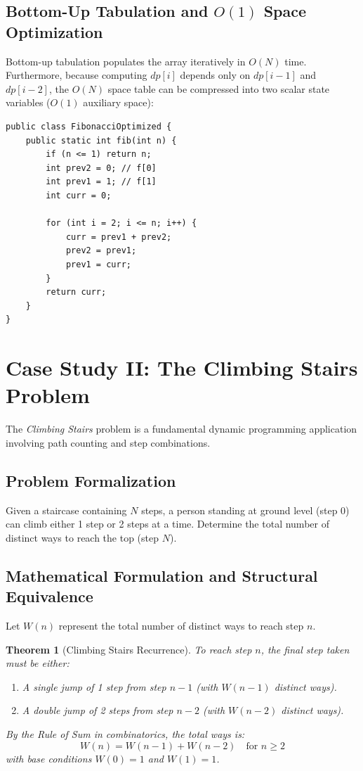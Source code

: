 \documentclass[10pt,journal,compsoc,onecolumn]{IEEEtran}
\newtheorem{theorem}{Theorem}
\begin{document}
\subsection{Bottom-Up Tabulation and $O(1)$ Space Optimization}

Bottom-up tabulation populates the array iteratively in $O(N)$ time. Furthermore, because computing $dp[i]$ depends only on $dp[i-1]$ and $dp[i-2]$, the $O(N)$ space table can be compressed into two scalar state variables ($O(1)$ auxiliary space):

\begin{verbatim}
public class FibonacciOptimized {
    public static int fib(int n) {
        if (n <= 1) return n;
        int prev2 = 0; // f[0]
        int prev1 = 1; // f[1]
        int curr = 0;

        for (int i = 2; i <= n; i++) {
            curr = prev1 + prev2;
            prev2 = prev1;
            prev1 = curr;
        }
        return curr;
    }
}
\end{verbatim}


\section{Case Study II: The Climbing Stairs Problem}
\label{sec:climbing-stairs}

The \emph{Climbing Stairs} problem is a fundamental dynamic programming application involving path counting and step combinations.

\subsection{Problem Formalization}

Given a staircase containing $N$ steps, a person standing at ground level (step 0) can climb either 1 step or 2 steps at a time. Determine the total number of distinct ways to reach the top (step $N$).

\subsection{Mathematical Formulation and Structural Equivalence}

Let $W(n)$ represent the total number of distinct ways to reach step $n$.

\begin{theorem}[Climbing Stairs Recurrence]
To reach step $n$, the final step taken must be either:
\begin{enumerate}
    \item A single jump of 1 step from step $n-1$ (with $W(n-1)$ distinct ways).
    \item A double jump of 2 steps from step $n-2$ (with $W(n-2)$ distinct ways).
\end{enumerate}
By the Rule of Sum in combinatorics, the total ways is:
\[
W(n) = W(n-1) + W(n-2) \quad \text{for } n \ge 2
\]
with base conditions $W(0) = 1$ and $W(1) = 1$.
\end{theorem}
\end{document}
